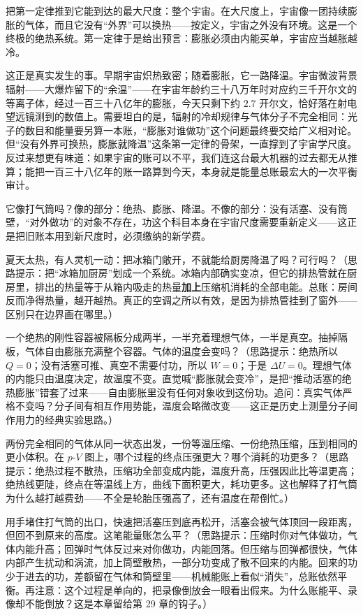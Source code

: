 \begin{thought}[膨胀的宇宙是一台绝热机吗]
把第一定律推到它能到达的最大尺度：整个宇宙。在大尺度上，宇宙像一团持续膨胀的气体，而且它没有“外界”可以换热——按定义，宇宙之外没有环境。这是一个终极的绝热系统。第一定律于是给出预言：膨胀必须由内能买单，宇宙应当越胀越冷。

这正是真实发生的事。早期宇宙炽热致密；随着膨胀，它一路降温。宇宙微波背景辐射——大爆炸留下的“余温”——在宇宙年龄约三十八万年时对应约三千开尔文的等离子体，经过一百三十八亿年的膨胀，今天只剩下约 \(2.7\) 开尔文，恰好落在射电望远镜测到的数值上。需要坦白的是，辐射的冷却规律与气体分子不完全相同：光子的数目和能量要另算一本账，“膨胀对谁做功”这个问题最终要交给广义相对论。但“没有外界可换热，膨胀就降温”这条第一定律的骨架，一直撑到了宇宙学尺度。反过来想更有味道：如果宇宙的账可以不平，我们连这台最大机器的过去都无从推算；能把一百三十八亿年的账一路算到今天，本身就是能量总账最宏大的一次平衡审计。

它像打气筒吗？像的部分：绝热、膨胀、降温。不像的部分：没有活塞、没有筒壁，“对外做功”的对象不存在，功这个科目本身在宇宙尺度需要重新定义——这正是把旧账本用到新尺度时，必须缴纳的新学费。
\end{thought}

\begin{puzzles}
  \item 夏天太热，有人灵机一动：把冰箱门敞开，不就能给厨房降温了吗？可行吗？（思路提示：把“冰箱加厨房”划成一个系统。冰箱内部确实变凉，但它的排热管就在厨房里，排出的热量等于从箱内吸走的热量\textbf{加上}压缩机消耗的全部电能。总账：房间反而净得热量，越开越热。真正的空调之所以有效，是因为排热管挂到了窗外——区别只在边界画在哪里。）
  \item 一个绝热的刚性容器被隔板分成两半，一半充着理想气体，一半是真空。抽掉隔板，气体自由膨胀充满整个容器。气体的温度会变吗？（思路提示：绝热所以 \(Q=0\)；没有活塞可推、真空不需要付功，所以 \(W=0\)；于是 \(\Delta U=0\)。理想气体的内能只由温度决定，故温度不变。直觉喊“膨胀就会变冷”，是把“推动活塞的绝热膨胀”错套了过来——自由膨胀里没有任何对象收到这份功。追问：真实气体严格不变吗？分子间有相互作用势能，温度会略微改变——这正是历史上测量分子间作用力的经典实验思路。）
  \item 两份完全相同的气体从同一状态出发，一份等温压缩、一份绝热压缩，压到相同的更小体积。在 \(p\)-\(V\) 图上，哪个过程的终点压强更大？哪个消耗的功更多？（思路提示：绝热过程不散热，压缩功全部变成内能，温度升高，压强因此比等温更高；绝热线更陡，终点在等温线上方，曲线下面积更大，耗功更多。这也解释了打气筒为什么越打越费劲——不全是轮胎压强高了，还有温度在帮倒忙。）
  \item 用手堵住打气筒的出口，快速把活塞压到底再松开，活塞会被气体顶回一段距离，但回不到原来的高度。这笔能量账怎么平？（思路提示：压缩时你对气体做功，气体内能升高；回弹时气体反过来对你做功，内能回落。但压缩与回弹都很快，气体内部产生扰动和涡流，加上筒壁散热，一部分功变成了散不回来的内能。回来的功少于进去的功，差额留在气体和筒壁里——机械能账上看似“消失”，总账依然平衡。再注意：这个过程是单向的，把录像倒放会一眼看出假来。为什么账能平、录像却不能倒放？这是本章留给第 29 章的钩子。）
\end{puzzles}
